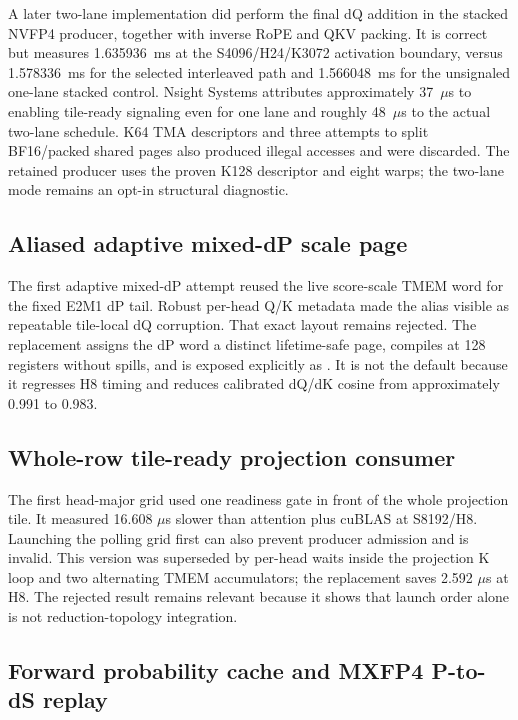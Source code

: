 A later two-lane implementation did perform the final dQ addition in the
stacked NVFP4 producer, together with inverse RoPE and QKV packing.  It is
correct but measures 1.635936~ms at the S4096/H24/K3072 activation boundary,
versus 1.578336~ms for the selected interleaved path and 1.566048~ms for the
unsignaled one-lane stacked control.  Nsight Systems attributes approximately
37~$\mu$s to enabling tile-ready signaling even for one lane and roughly
48~$\mu$s to the actual two-lane schedule.  K64 TMA descriptors and three
attempts to split BF16/packed shared pages also produced illegal accesses and
were discarded.  The retained producer uses the proven K128 descriptor and
eight warps; the two-lane mode remains an opt-in structural diagnostic.

\subsection{Aliased adaptive mixed-dP scale page}

The first adaptive mixed-dP attempt reused the live score-scale TMEM word for
the fixed E2M1 dP tail.  Robust per-head Q/K metadata made the alias visible as
repeatable tile-local dQ corruption.  That exact layout remains rejected.  The
replacement assigns the dP word a distinct lifetime-safe page, compiles at 128
registers without spills, and is exposed explicitly as
.  It is not the default because it regresses H8 timing
and reduces calibrated dQ/dK cosine from approximately 0.991 to 0.983.

\subsection{Whole-row tile-ready projection consumer}

The first head-major grid used one readiness gate in front of the whole
projection tile.  It measured 16.608 $\mu$s slower than attention plus cuBLAS
at S8192/H8.  Launching the polling grid first can also prevent producer
admission and is invalid.  This version was superseded by per-head waits inside
the projection K loop and two alternating TMEM accumulators; the replacement
saves 2.592 $\mu$s at H8.  The rejected result remains relevant because it
shows that launch order alone is not reduction-topology integration.

\subsection{Forward probability cache and MXFP4 P-to-dS replay}

